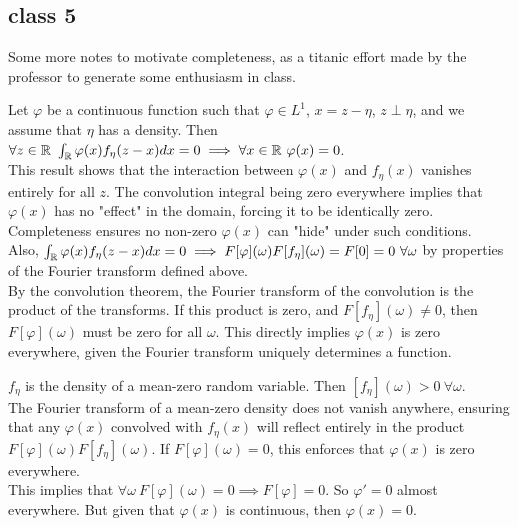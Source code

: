 \documentclass{article}
\begin{document}
\subsection{class 5}
Some more notes to motivate completeness, as a titanic effort made by the professor to generate some enthusiasm in class. 

\begin{proposition}
    Let \(\varphi\) be a continuous function such that \(\varphi \in L^{1}\), \(x=z-\eta\), \(z \perp \eta\), and we assume that \(\eta\) has a density. Then \(\forall z \in \R \ \int_{\R}\varphi(x)f_{\eta}(z-x)dx=0 \implies \forall x \in \R \ \varphi(x)=0\). \\  
    
    This result shows that the interaction between \(\varphi(x)\) and \(f_\eta(x)\) vanishes entirely for all \(z\). The convolution integral being zero everywhere implies that \(\varphi(x)\) has no "effect" in the domain, forcing it to be identically zero. Completeness ensures no non-zero \(\varphi(x)\) can "hide" under such conditions.\\

    Also, \( \int_{\mathbb{R}}\varphi(x)f_{\eta}(z-x)dx=0 \implies F[\varphi](\omega) F[f_{\eta}](\omega)=F[0]=0 \ \forall \omega \) by properties of the Fourier transform defined above. \\
    
    By the convolution theorem, the Fourier transform of the convolution is the product of the transforms. If this product is zero, and \(F[f_\eta](\omega) \neq 0\), then \(F[\varphi](\omega)\) must be zero for all \(\omega\). This directly implies \(\varphi(x)\) is zero everywhere, given the Fourier transform uniquely determines a function.
\end{proposition}

\begin{example}
    \(f_{\eta}\) is the density of a mean-zero random variable. Then \([f_{\eta}](\omega)>0 \ \forall \omega\). \\
    
    The Fourier transform of a mean-zero density does not vanish anywhere, ensuring that any \(\varphi(x)\) convolved with \(f_\eta(x)\) will reflect entirely in the product \(F[\varphi](\omega) F[f_\eta](\omega)\). If \(F[\varphi](\omega) = 0\), this enforces that \(\varphi(x)\) is zero everywhere. \\

    This implies that \( \forall \omega \ F[\varphi](\omega)=0 \implies F[\varphi]=0\). So \(\varphi'=0\) almost everywhere. But given that \(\varphi(x)\) is continuous, then \(\varphi(x)=0\).
\end{example}
\end{document}

